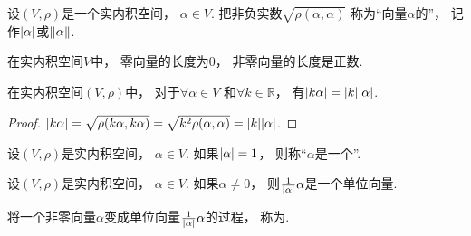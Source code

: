 \begin{definition}
设\((V,\rho)\)是一个实内积空间，
\(\alpha \in V\).
把非负实数\(\sqrt{\rho(\alpha,\alpha)}\)
称为“向量\(\alpha\)的”，
记作\(\abs{\alpha}\)或\(\norm{\alpha}\).
\end{definition}

\begin{property}\label{theorem:实内积空间.向量的长度具有非负性}
在实内积空间\(V\)中，
零向量的长度为\(0\)，
非零向量的长度是正数.
\end{property}

\begin{property}\label{theorem:实内积空间.向量的长度具有齐次性}
在实内积空间\((V,\rho)\)中，
对于\(\forall \alpha \in V\)
和\(\forall k \in \mathbb{R}\)，
有\(\abs{k\alpha} = \abs{k} \abs{\alpha}\).
\begin{proof}
\(\abs{k\alpha}
= \sqrt{\rho(k\alpha,k\alpha)}
= \sqrt{k^2\rho(\alpha,\alpha)}
= \abs{k} \abs{\alpha}\).
\end{proof}
\end{property}

\begin{definition}
设\((V,\rho)\)是实内积空间，
\(\alpha \in V\).
如果\(\abs{\alpha} = 1\)，
则称“\(\alpha\)是一个”.
\end{definition}

\begin{property}
设\((V,\rho)\)是实内积空间，
\(\alpha \in V\).
如果\(\alpha\neq0\)，
则\(\frac1{\abs{\alpha}} \alpha\)是一个单位向量.
\end{property}
\begin{remark}
将一个非零向量\(\alpha\)变成单位向量\(\frac1{\abs{\alpha}} \alpha\)的过程，
称为.
\end{remark}

